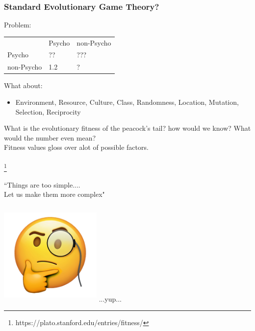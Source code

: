 \documentclass{beamer}
\newcommand\blfootnote[1]{%
  \begingroup
  \renewcommand\thefootnote{}\footnote{#1}%
  \addtocounter{footnote}{-1}%
  \endgroup
}
\begin{document}
\begin{frame}
\frametitle{Standard Evolutionary Game Theory?}
Problem:
\begin{table}[]
\begin{tabular}{lll}
                                & Psycho                   & non-Psycho               \\ \cline{2-3} 
\multicolumn{1}{l|}{Psycho}     & \multicolumn{1}{l|}{??}  & \multicolumn{1}{l|}{???} \\ \cline{2-3} 
\multicolumn{1}{l|}{non-Psycho} & \multicolumn{1}{l|}{1.2} & \multicolumn{1}{l|}{?}   \\ \cline{2-3} 
\end{tabular}
\end{table}
What about:
\begin{itemize}
    \item Environment, Resource, Culture, Class, Randomness, Location, Mutation, Selection, Reciprocity
\end{itemize}
What is the evolutionary fitness of the peacock's tail?
how would we know? What would the number even mean?\-\\
Fitness values gloss over alot of possible factors.\\ \-\\
\blfootnote{https://plato.stanford.edu/entries/fitness/}
\end{frame}






\begin{frame}
{\huge ``Things are too simple....\\\-\hspace{1cm} Let us make them more complex"}\\\-\\\-\hspace{5cm}
\includegraphics[width=5cm,height=5cm]{thinking_emoji.png}
...yup...
\end{frame}
\end{document}
